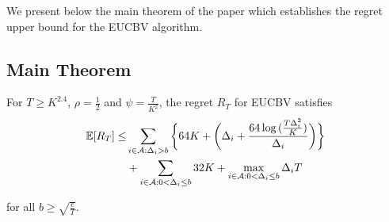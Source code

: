 

We present below the main theorem of the paper which establishes the regret upper bound for the EUCBV  algorithm. 
\subsection*{Main Theorem}
\begin{theorem}
\label{Result:Theorem:1}
For $T\geq K^{2.4}$, $\rho=\frac{1}{2}$ and $\psi=\frac{T}{K^2}$, the regret $R_T$ for EUCBV satisfies
\begin{align*}
\mathbb{E} [R_{T}] \leq &\sum\limits_{i\in \mathcal{A} :\Delta_{i} > b}\bigg\lbrace 64 K + \bigg(\Delta_{i}+\dfrac{64\log{(\frac{T\Delta_{i}^{2}}{K})}}{\Delta_{i}}\bigg)\bigg \rbrace\\ 
  & +\sum\limits_{i\in \mathcal{A} :0 < \Delta_{i}\leq b} 32 K + \max_{i\in \mathcal{A} :0 < \Delta_{i}\leq b}\Delta_{i}T  
\end{align*}

for all $b\geq\sqrt{\frac{e}{T}}$. 
\end{theorem}

